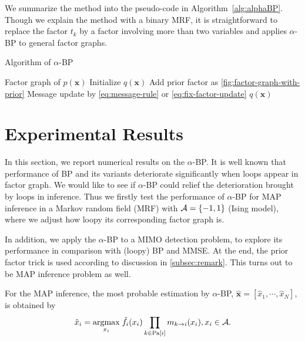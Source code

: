 \documentclass[conference]{IEEEtran}
\begin{document}
We summarize the method into the pseudo-code in Algorithm~\autoref{alg:alphaBP}. Though we explain the method with a binary MRF, it is straightforward to replace the factor $t_k$ by a factor involving more than two variables and applies $\alpha$-BP to general factor graphs.
\begin{algorithm}
  \caption{Algorithm of $\alpha$-BP}\label{alg:alphaBP}
  \begin{algorithmic}[1]
    \renewcommand{\algorithmicrequire}{\textbf{Input:}}
    \renewcommand{\algorithmicensure}{\textbf{Output:}}
    \REQUIRE Factor graph of $p(\bm{x})$
    \STATE Initialize $q(\bm{x})$
    \STATE Add prior factor as \autoref{fig:factor-graph-with-prior}
    \ENDIF
    \STATE Message update by \autoref{eq:message-rule} or \autoref{eq:fix-factor-update}
    \ENDFOR
    \ENDWHILE
    \RETURN $q(\bm{x})$ 
  \end{algorithmic} 
\end{algorithm}

\section{Experimental Results}
In this section, we report numerical results on the $\alpha$-BP. It is well known that performance of BP and its variants deteriorate significantly when loops appear in factor graph. We would like to see if $\alpha$-BP could relief the deterioration brought by loops in inference. Thus we firstly test the performance of $\alpha$-BP for MAP inference in a Markov random field (MRF) with $\mathcal{A}=\{-1,1\}$ (Ising model), where we adjust how loopy its corresponding factor graph is.

In addition, we apply the $\alpha$-BP to a MIMO detection problem, to explore its performance in comparison with (loopy) BP and MMSE. At the end, the prior factor trick is used according to discussion in \autoref{subsec:remark}. This turns out to be MAP inference problem as well.

For the MAP inference, the most probable estimation by $\alpha$-BP, $\hat{\bm{x}}=[\hat{x}_1, \cdots, \hat{x}_N]$, is obtained by
\begin{align}
  \hat{x}_{i} = \underset{x_i}{\operatorname{argmax}}\;\tilde{f}_i(x_i) \prod_{k\in \text{Pa}[i]} m_{k\rightarrow i}(x_i), x_i \in \mathcal{A}.
\end{align}
\end{document}
